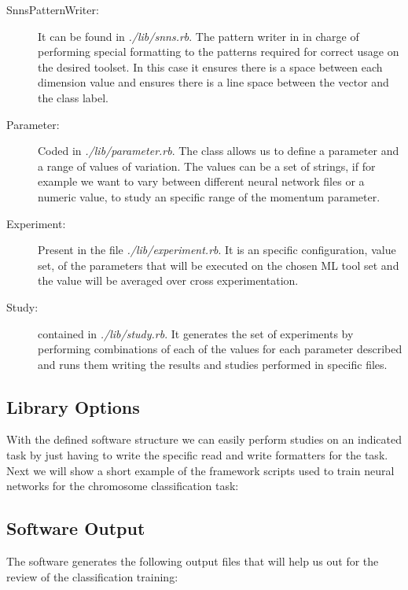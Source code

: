 \documentclass[a4paper,10pt,titlepage]{article}
\begin{document}
\begin{description}
	\item[SnnsPatternWriter:] It can be found in \textit{./lib/snns.rb}. The pattern writer in in charge of performing special formatting to the patterns required for correct usage on the desired toolset. In this case it ensures there is a space between each dimension value and ensures there is a line space between the vector and the class label. 
	\item[Parameter:] Coded in \textit{./lib/parameter.rb}. The class allows us to define a parameter and a range of values of variation. The values can be a set of strings, if for example we want to vary between different neural network files or a numeric value, to study an specific range of the momentum parameter. 
	\item[Experiment:] Present in the file \textit{./lib/experiment.rb}. It is an specific configuration, value set, of the parameters that will be executed on the chosen ML tool set and the value will be averaged over cross experimentation. 
	\item[Study:] contained in \textit{./lib/study.rb}. It generates the set of experiments by performing combinations of each of the values for each parameter described and runs them writing the results and studies performed in specific files. 
\end{description}
\subsection{Library Options}

\par With the defined software structure we can easily perform studies on an indicated task by just having to write the specific
read and write formatters for the task. Next we will show a short example of the framework scripts used to train neural networks 
for the chromosome classification task: 

\lstset{basicstyle=\footnotesize,language=Ruby}
\lstset{linewidth=500pt}
\lstset{numbers=left, stepnumber=1}
\lstset{frame=trBL,frameround=tttt}


\subsection{Software Output}

\par The software generates the following output files that will help us out for the review of the classification training:
\end{document}
